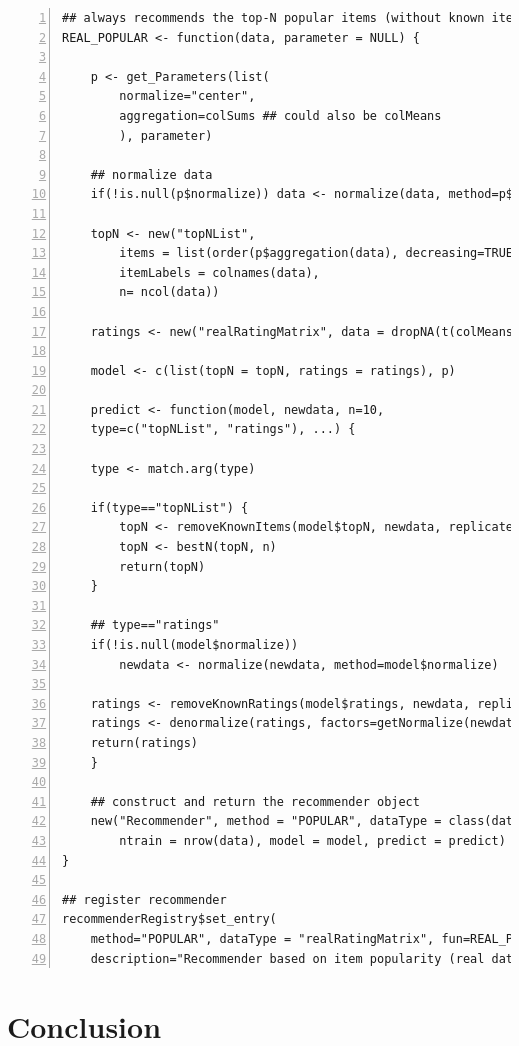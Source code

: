 \documentclass[nojss]{jss}
\begin{document}
\begin{table}
\caption{Defining and registering a new recommender algorithm.}
\label{table:newalg}
\begin{Verbatim}[gobble=0, numbers=left]
## always recommends the top-N popular items (without known items)
REAL_POPULAR <- function(data, parameter = NULL) {

    p <- get_Parameters(list(
		normalize="center",
		aggregation=colSums ## could also be colMeans
		), parameter)

    ## normalize data
    if(!is.null(p$normalize)) data <- normalize(data, method=p$normalize)

    topN <- new("topNList",
	    items = list(order(p$aggregation(data), decreasing=TRUE)),
	    itemLabels = colnames(data),
	    n= ncol(data))

    ratings <- new("realRatingMatrix", data = dropNA(t(colMeans(data))))

    model <- c(list(topN = topN, ratings = ratings), p)

    predict <- function(model, newdata, n=10,
	type=c("topNList", "ratings"), ...) {

	type <- match.arg(type)

	if(type=="topNList") {
	    topN <- removeKnownItems(model$topN, newdata, replicate=TRUE)
	    topN <- bestN(topN, n)
	    return(topN)
	}

	## type=="ratings"
	if(!is.null(model$normalize))
	    newdata <- normalize(newdata, method=model$normalize)

	ratings <- removeKnownRatings(model$ratings, newdata, replicate=TRUE)
	ratings <- denormalize(ratings, factors=getNormalize(newdata))
	return(ratings)
    }

    ## construct and return the recommender object
    new("Recommender", method = "POPULAR", dataType = class(data),
	    ntrain = nrow(data), model = model, predict = predict)
}

## register recommender
recommenderRegistry$set_entry(
	method="POPULAR", dataType = "realRatingMatrix", fun=REAL_POPULAR,
	description="Recommender based on item popularity (real data).")
\end{Verbatim}
\end{table}


\section{Conclusion}
\label{sec:conclusion}
\end{document}
